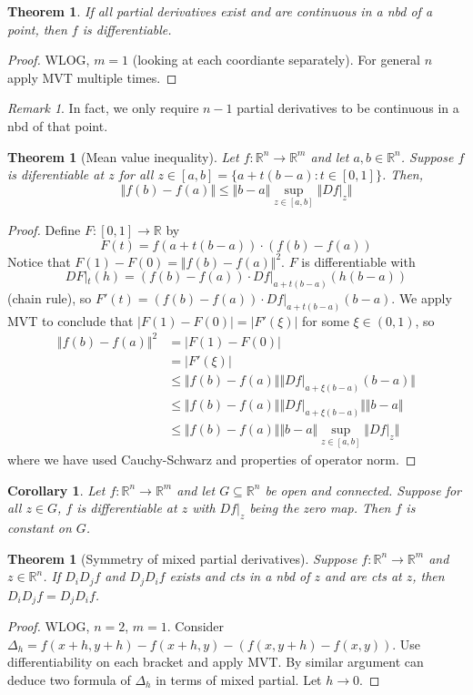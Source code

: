 \documentclass{article}
\theoremstyle{definition}
\theoremstyle{remark}
\newtheorem{rem}{Remark}
\theoremstyle{plain}
\newtheorem{thm}[defn]{Theorem}
\newtheorem{crly}[defn]{Corollary}
\theoremstyle{definition}
\newcommand{\RR}{\mathbb{R}}
\begin{document}
\begin{thm}
    If all partial derivatives exist and are continuous in a nbd of a point, then $f$ is differentiable.
\end{thm}
\begin{proof}
    WLOG, $m=1$ (looking at each coordiante separately). For general $n$ apply MVT multiple times.
\end{proof}
\begin{rem}
    In fact, we only require $n-1$ partial derivatives to be continuous in a nbd of that point.
\end{rem}
\begin{thm}[Mean value inequality]
    Let $f:\RR^n\to\RR^m$ and let $a,b\in\RR^n$. Suppose $f$ is diferentiable at $z$ for all $z\in[a,b]=\{a+t(b-a):t\in[0,1]\}$. Then,
    \[\Vert f(b)-f(a)\Vert\le\Vert b-a\Vert\sup_{z\in[a,b]}\Vert Df|_z\Vert\]
\end{thm}
\begin{proof}
Define $F:[0,1]\to\RR$ by \[F(t)=f(a+t(b-a))\cdot(f(b)-f(a))\]
Notice that $F(1)-F(0)=\Vert f(b)-f(a)\Vert^2$. $F$ is differentiable with $$DF|_t(h)=(f(b)-f(a))\cdot Df|_{a+t(b-a)}(h(b-a))$$ (chain rule), so $F'(t)=(f(b)-f(a))\cdot Df|_{a+t(b-a)}(b-a)$. We apply MVT to conclude that $|F(1)-F(0)|=|F'(\xi)|$ for some $\xi\in(0,1)$, so
\begin{align*}
    \Vert f(b)-f(a)\Vert^2&=|F(1)-F(0)|\\
    &=|F'(\xi)|\\
    &\le \Vert f(b)-f(a)\Vert \Vert Df|_{a+\xi(b-a)}(b-a)\Vert\\
    &\le \Vert f(b)-f(a)\Vert \Vert Df|_{a+\xi(b-a)}\Vert\Vert b-a\Vert\\
    &\le \Vert f(b)-f(a)\Vert \Vert b-a\Vert\sup_{z\in[a,b]}\Vert Df|_z\Vert
\end{align*}
where we have used Cauchy-Schwarz and properties of operator norm.
\end{proof}
\begin{crly}
    Let $f:\RR^n\to\RR^m$ and let $G\subseteq\RR^n$ be open and connected. Suppose for all $z\in G$, $f$ is differentiable at $z$ with $Df|_z$ being the zero map. Then $f$ is constant on $G$.
\end{crly}
\begin{thm}[Symmetry of mixed partial derivatives]
Suppose $f:\RR^n\to\RR^m$ and $z\in\RR^n$. If $D_iD_jf$ and $D_jD_if$ exists and cts in a nbd of $z$ and are cts at $z$, then $D_iD_jf=D_jD_if$.
\end{thm}
\begin{proof}
    WLOG, $n=2$, $m=1$. Consider $\Delta_h=f(x+h,y+h)-f(x+h,y)-(f(x,y+h)-f(x,y))$.
    Use differentiability on each bracket and apply MVT. By similar argument can deduce two formula of $\Delta_h$ in terms of mixed partial. Let $h\to 0$.
\end{proof}
\end{document}
